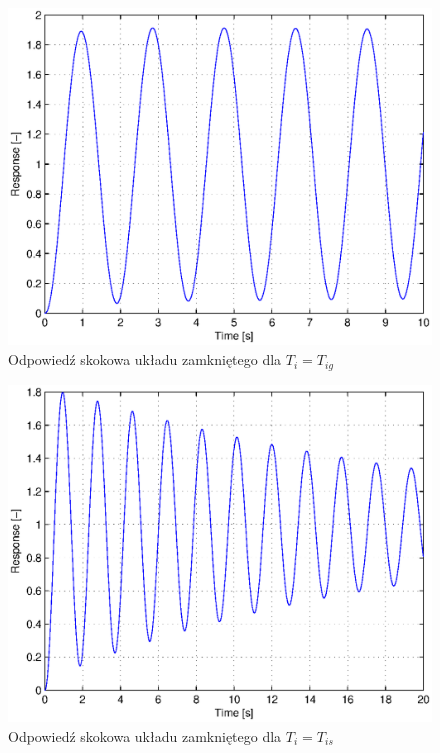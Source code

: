 \documentclass[12pt]{article}
\begin{document}
\begin{figure}[!htb]
	\begin{center}
		\includegraphics[width=12cm]{../res/img/2-2-0,5_resp.eps} 
	\end{center}
	\caption{Odpowiedź skokowa układu zamkniętego dla $T_{i}=T_{ig}$}
\end{figure}

\begin{figure}[!htb]
	\begin{center}
		\includegraphics[width=12cm]{../res/img/2-10-0,5_resp.eps} 
	\end{center}
	\caption{Odpowiedź skokowa układu zamkniętego dla $T_{i}=T_{is}$}
\end{figure}
\end{document}
